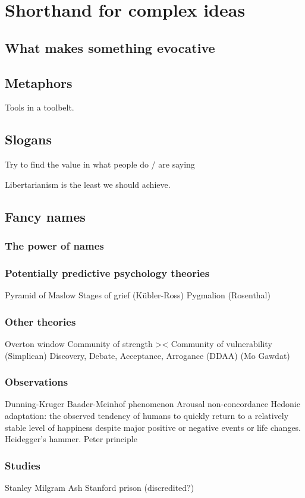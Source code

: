 \documentclass{report}
\begin{document}
\chapter{Shorthand for complex ideas}
\section{What makes something evocative}
\section{Metaphors}
Tools in a toolbelt.
\section{Slogans}
Try to find the value in what people do / are saying

Libertarianism is the least we should achieve.
\section{Fancy names}
\subsection{The power of names}
\subsection{Potentially predictive psychology theories}
Pyramid of Maslow
Stages of grief (Kübler-Ross)
Pygmalion (Rosenthal)
\subsection{Other theories}
Overton window
Community of strength >< Community of vulnerability (Simplican)
Discovery, Debate, Acceptance, Arrogance (DDAA) (Mo Gawdat)
\subsection{Observations}
Dunning-Kruger
Baader-Meinhof phenomenon
Arousal non-concordance
Hedonic adaptation: the observed tendency of humans to quickly return to a relatively stable level of happiness despite major positive or negative events or life changes.
Heidegger's hammer.
Peter principle
\subsection{Studies}
Stanley Milgram
Ash
Stanford prison (discredited?)
\end{document}
